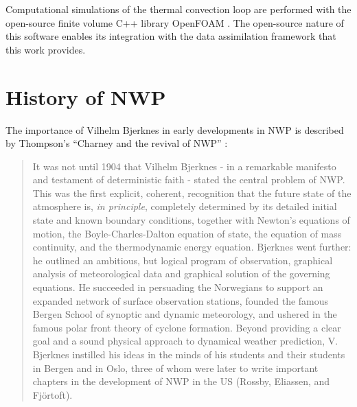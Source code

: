 Computational simulations of the thermal convection loop are performed with the open-source finite volume C++ library OpenFOAM .
The open-source nature of this software enables its integration with the data assimilation framework that this work provides.

\section{History of NWP}

The importance of Vilhelm Bjerknes in early developments in NWP is described by Thompson's ``Charney and the revival of NWP'' :

\begin{quote}
It was not until 1904 that Vilhelm Bjerknes - in a remarkable manifesto and testament of deterministic faith - stated the central problem of NWP.
This was the first explicit, coherent, recognition that the future state of the atmosphere is, \emph{in principle}, completely determined by its detailed initial state and known boundary conditions, together with Newton's equations of motion, the Boyle-Charles-Dalton equation of state, the equation of mass continuity, and the thermodynamic energy equation.
Bjerknes went further: he outlined an ambitious, but logical program of observation, graphical analysis of meteorological data and graphical solution of the governing equations.
He succeeded in persuading the Norwegians to support an expanded network of surface observation stations, founded the famous Bergen School of synoptic and dynamic meteorology, and ushered in the famous polar front theory of cyclone formation.
Beyond providing a clear goal and a sound physical approach to dynamical weather prediction, V. Bjerknes instilled his ideas in the minds of his students and their students in Bergen and in Oslo, three of whom were later to write important chapters in the development of NWP in the US (Rossby, Eliassen, and Fj\"{o}rtoft).
\end{quote}

